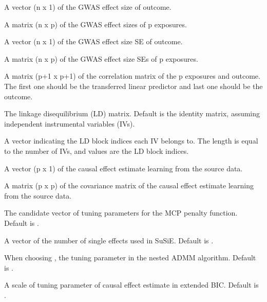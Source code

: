\documentclass[a4paper]{book}
\begin{document}
\begin{Arguments}
\begin{ldescription}
\item[\code{by}] A vector (n x 1) of the GWAS effect size of outcome.

\item[\code{bX}] A matrix (n x p) of the GWAS effect sizes of p exposures.

\item[\code{byse}] A vector (n x 1) of the GWAS effect size SE of outcome.

\item[\code{bXse}] A matrix (n x p) of the GWAS effect size SEs of p exposures.

\item[\code{Rxy}] A matrix (p+1 x p+1) of the correlation matrix of the p exposures and outcome. The first one should be the transferred linear predictor and last one should be the outcome.

\item[\code{LD}] The linkage disequilibrium (LD) matrix. Default is the identity matrix, assuming independent instrumental variables (IVs).

\item[\code{cluster.index}] A vector indicating the LD block indices each IV belongs to. The length is equal to the number of IVs, and values are the LD block indices.

\item[\code{theta.source}] A vector (p x 1) of the causal effect estimate learning from the source data.

\item[\code{theta.source.cov}] A matrix (p x p) of the covariance matrix of the causal effect estimate learning from the source data.

\item[\code{tauvec}] The candidate vector of tuning parameters for the MCP penalty function. Default is .

\item[\code{Lvec}] A vector of the number of single effects used in SuSiE. Default is .

\item[\code{admm.rho}] When choosing , the tuning parameter in the nested ADMM algorithm. Default is .

\item[\code{ebic.delta}] A scale of tuning parameter of causal effect estimate in extended BIC. Default is .


\end{ldescription}
\end{Arguments}
\end{document}
